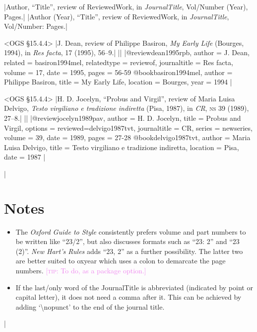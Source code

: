 \documentclass[extrafontsizes,11pt,a4paper,oneside]{memoir}
\newcommand*{\lit}[1]{\textsf{#1}}
\newcommand*{\code}[1]{`\textsf{#1}'}
\newcommand*{\aside}[1]{\textcolor{violet}{[\textsc{tip:} #1]}}
\begin{document}
\specs
|Author, \enquote{Title}, \lit{review of} ReviewedWork, \lit{in} \emph{JournalTitle}, Vol/Number (Year), Pages.|%
|Author (Year), \enquote{Title}, \lit{review of} ReviewedWork, \lit{in} \emph{JournalTitle}, Vol/Number: Pages.|

\bibexample<OGS \S15.4.4>
|J. Dean, review of Philippe Basiron, \emph{My Early Life} (Bourges, 1994), in \emph{Res facta}, 17 (1995), 56--9.|%
||%
|@review{dean1995rpb,
  author = {J. Dean},
  related = {basiron1994mel},
  relatedtype = {reviewof},
  journaltitle = {Res facta},
  volume = {17},
  date = {1995},
  pages = {56-59}
}
@book{basiron1994mel,
  author = {Philippe Basiron},
  title = {My Early Life},
  location = {Bourges},
  year = {1994}
}|

\bibexample<OGS \S15.4.4>
|H. D. Jocelyn, \enquote{Probus and Virgil}, review of Maria Luisa Delvigo, \emph{Testo virgiliano e tradizione indiretta} (Pisa, 1987), in \emph{CR}, \textsc{ns} 39 (1989), 27--8.|%
||%
|@review{jocelyn1989pav,
  author = {H. D. Jocelyn},
  title = {Probus and Virgil},
  options = {reviewed=delvigo1987tvt},
  journaltitle = {CR},
  series = {newseries},
  volume = {39},
  date = {1989},
  pages = {27-28}
}
@book{delvigo1987tvt,
  author = {Maria Luisa Delvigo},
  title = {Testo virgiliano e tradizione indiretta},
  location = {Pisa},
  date = {1987}
}|


\todoc|
\section{Notes}

\begin{itemize}
  \item The \emph{Oxford Guide to Style} consistently prefers volume and part numbers to be written like \enquote{23/2}, but also discusses formats such as \enquote{23: 2} and \enquote{23 (2)}. \emph{New Hart's Rules} adds \enquote{23, 2} as a further possibility. The latter two are better suited to \textsf{oxyear} which uses a colon to demarcate the page numbers. \aside{To do, as a package option.}
  
  \item If the last\slash only word of the JournalTitle is abbreviated (indicated by point or capital letter), it does not need a comma after it. This can be achieved by adding \code{\textbackslash nopunct} to the end of the journal title.
\end{itemize}
|
\end{document}
